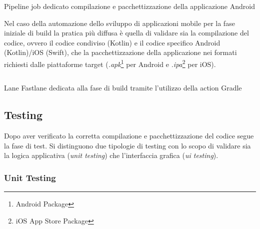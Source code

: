\begin{listing}[H]
\inputminted{yaml}{code/4-buildjob}
\caption{Pipeline job dedicato compilazione e pacchettizzazione della applicazione Android}
\end{listing}

Nel caso della automazione dello sviluppo di applicazioni mobile per la fase iniziale di build la pratica più diffusa è quella di validare sia la compilazione del codice, ovvero il codice condiviso (Kotlin) e il codice specifico Android (Kotlin)/iOS (Swift), che la pacchettizzazione della applicazione nei formati richiesti dalle piattaforme target (\textit{.apk}\footnote{Android Package} per Android e \textit{.ipa}\footnote{iOS App Store Package} per iOS).

\begin{listing}[H]
\inputminted{ruby}{code/4-buildft}
\caption{Lane Fastlane dedicata alla fase di build tramite l'utilizzo della action Gradle}
\end{listing}

\subsection{Testing}
Dopo aver verificato la corretta compilazione e pacchettizzazione del codice segue la fase di test. Si distinguono due tipologie di testing con lo scopo di validare sia la logica applicativa (\textit{unit testing}) che l'interfaccia grafica (\textit{ui testing}).
\subsubsection{Unit Testing}

